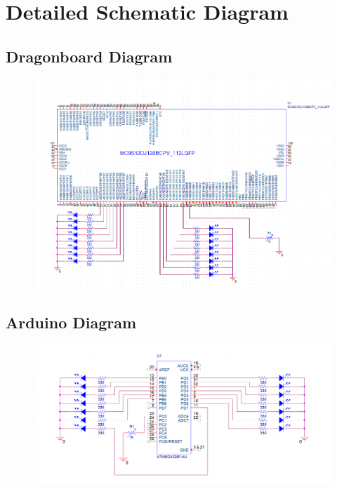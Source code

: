 \documentclass{article}
\begin{document}
	\section*{Detailed Schematic Diagram}
	\subsection*{Dragonboard Diagram}
		\begin{figure}[H]
		\centering
		\includegraphics[width=1\textwidth]{Dragon_Diagram}
	\end{figure}
	
	\subsection*{Arduino Diagram}
		\begin{figure}[H]
		\centering
		\includegraphics[width=1\textwidth]{Arduino_Diagram}
	\end{figure}
	
\end{document}
